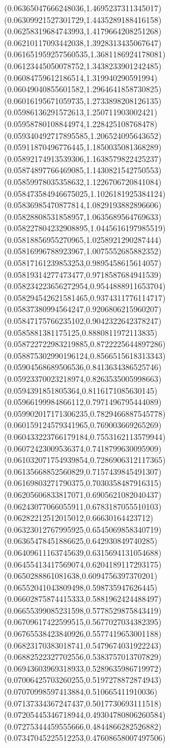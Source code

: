{(0.06365047666248036,1.4695237311345017)
(0.06309921527301729,1.4435289188416158)
(0.06258319684743993,1.4179664208251268)
(0.06210117093442038,1.3928313435067647)
(0.061651959257560535,1.3681186924178081)
(0.06123445050078752,1.3438233901242485)
(0.06084759612186514,1.319940290591994)
(0.06049040855601582,1.2964641858730825)
(0.06016195671059735,1.2733898208126135)
(0.05986136291572613,1.250711903002421)
(0.05958780108844974,1.228425108768478)
(0.059340492717895585,1.206524095643652)
(0.05911870496776445,1.1850035081368289)
(0.05892174913539306,1.1638579822425237)
(0.05874897766469085,1.1430821542750553)
(0.05859978035358632,1.1226706720841084)
(0.058473584946675025,1.1026181925384124)
(0.05836985470877814,1.0829193882896606)
(0.05828808531858957,1.0635689564769633)
(0.058227804232908895,1.0445616197985519)
(0.05818856955270965,1.0258921290287444)
(0.05816996788923967,1.0075552685882352)
(0.05817161239853253,0.9895458615614057)
(0.05819314277473477,0.9718587684941539)
(0.058234223656272954,0.9544888911653704)
(0.058294542621581465,0.9374311776114717)
(0.05837380994564247,0.9206806215960207)
(0.05847175766235102,0.9042322642378247)
(0.0585881381175125,0.8880811972113835)
(0.058722722983219885,0.8722225644897286)
(0.058875302990196124,0.8566515618313343)
(0.05904568689506536,0.8413634386525746)
(0.05923370023218974,0.8263535005998663)
(0.0594391851805364,0.8116171085630145)
(0.05966199984866112,0.7971496795444089)
(0.059902017171306235,0.7829466887545778)
(0.060159124579341965,0.769003669265269)
(0.060433223766179184,0.7553162113579944)
(0.06072423009536374,0.7418799630095909)
(0.061032071754939854,0.7286906312117365)
(0.06135668852560829,0.7157439845491307)
(0.06169803271790375,0.7030358487916315)
(0.06205606833817071,0.6905621082040437)
(0.06243077066055911,0.6783187055510103)
(0.06282212512015012,0.66630164423712)
(0.06323012767995925,0.6545069858340719)
(0.06365478451886625,0.642930849740285)
(0.06409611163745639,0.6315694131054688)
(0.06455413417569074,0.6204189117293175)
(0.0650288861081638,0.6094756397370201)
(0.06552041043809498,0.598735947626445)
(0.06602875874415333,0.5881962424488497)
(0.06655399085231598,0.5778529875843419)
(0.06709617422599515,0.5677027034382395)
(0.06765538423840926,0.5577419653001188)
(0.06823170383018741,0.5479674031922243)
(0.06882522327702556,0.5383757013707829)
(0.06943603969318933,0.5289635986719972)
(0.07006425703260255,0.5197278872874943)
(0.07070998597413884,0.510665411910036)
(0.07137334367247437,0.5017730693111518)
(0.07205445346718944,0.49304780806260584)
(0.07275344459555666,0.4844866282526882)
(0.07347045225512253,0.47608658007497506)
}
